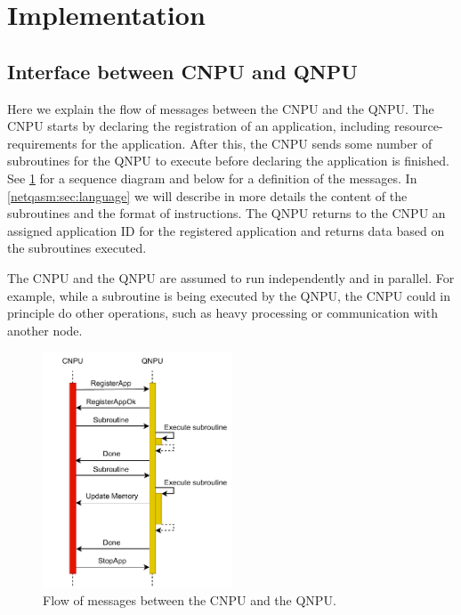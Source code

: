 \section{Implementation}
\label{netqasm:sec:implementation}

\subsection{Interface between \ac{CNPU} and \ac{QNPU}}
Here we explain the flow of messages between the \ac{CNPU} and the \ac{QNPU}.
The \ac{CNPU} starts by declaring the registration of an application, including resource-requirements for the application.
After this, the \ac{CNPU} sends some number of subroutines for the \ac{QNPU} to execute before declaring the application is finished.
See \cref{netqasm:fig:message_sequence} for a sequence diagram and below for a definition of the messages.
In \cref{netqasm:sec:language} we will describe in more details the content of the subroutines and the format of instructions.
The \ac{QNPU} returns to the \ac{CNPU} an assigned application ID for the registered application and returns data based on the subroutines executed.

The \ac{CNPU} and the \ac{QNPU} are assumed to run independently and in parallel.
For example, while a subroutine is being executed by the \ac{QNPU}, the \ac{CNPU} could in principle do other operations, such as heavy processing or communication with another node.

\begin{figure}
      \centering
      \includegraphics[width=0.5\textwidth]{figures/netqasm/message-flow.pdf}
      \caption{Flow of messages between the \ac{CNPU} and the \ac{QNPU}.}
      \label{netqasm:fig:message_sequence}
\end{figure}


